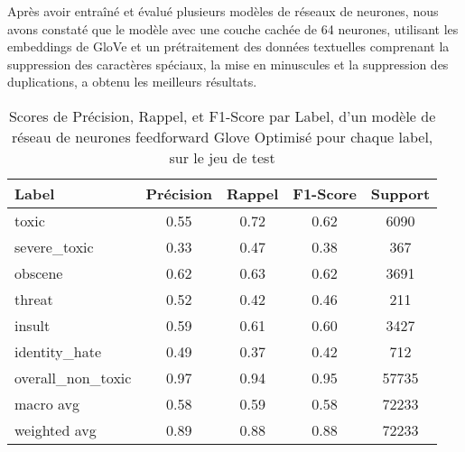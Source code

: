 Après avoir entraîné et évalué plusieurs modèles de réseaux de neurones, nous avons constaté que le modèle avec une couche cachée de 64 neurones, utilisant les embeddings de GloVe et un prétraitement des données textuelles comprenant la suppression des caractères spéciaux, la mise en minuscules et la suppression des duplications, a obtenu les meilleurs résultats.
\begin{table}[ht]
    \centering
    \caption{Scores de Précision, Rappel, et F1-Score par Label, d'un modèle de réseau de neurones feedforward Glove Optimisé pour chaque label, sur le jeu de test}    \begin{tabular}{lcccc}
    \hline
    \textbf{Label} & \textbf{Précision} & \textbf{Rappel} & \textbf{F1-Score} & \textbf{Support} \\ \hline
    toxic          & 0.55               & 0.72            & 0.62              & 6090             \\
    severe\_toxic  & 0.33               & 0.47            & 0.38              & 367              \\
    obscene        & 0.62               & 0.63            & 0.62              & 3691             \\
    threat         & 0.52               & 0.42            & 0.46              & 211              \\
    insult         & 0.59               & 0.61            & 0.60              & 3427             \\
    identity\_hate & 0.49               & 0.37            & 0.42              & 712              \\
    overall\_non\_toxic & 0.97           & 0.94            & 0.95              & 57735            \\\hline
    macro avg      & 0.58              & 0.59            & 0.58              & 72233            \\
    weighted avg   & 0.89               & 0.88            & 0.88              & 72233            \\ \hline
    \end{tabular}
    \label{tab:scores}
\end{table}